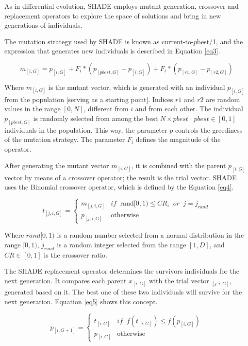 \documentclass[review]{elsarticle}
\begin{document}
As in differential evolution, SHADE employs mutant generation, crossover and replacement operators to explore the space of solutions and bring in new generations of individuals.

The mutation strategy used by SHADE is known as current-to-$p$best/1, and the expression that generates new individuals is described in Equation \eqref{eq3}.

\begin{equation}
m_{[i,G]} = p_{[i,G]} + F_i * (p_{[pbest, G]} - p_{[i,G]}) + F_i * (p_{[r1, G]} - p_{[r2,G]})
\label{eq3}
\end{equation}

Where $m_{[i,G]}$ is the mutant vector, which is generated with an individual $p_{[i,G]}$ from the population [serving as a starting point]. Indices $r1$ and $r2$ are random values in the range $[0,N]$, different from $i$ and from each other. The individual $p_{[pbest, G]}$ is randomly selected from among the best $N \times pbest\;|\;pbest\in [0,1]$ individuals in the population. This way, the parameter $p$ controls the greediness of the mutation strategy. The parameter $F_i$ defines the magnitude of the operator.

After generating the mutant vector $m_{[i,G]}$, it is combined with the parent $p_{[i,G]}$ vector by means of a crossover operator; the result is the trial vector. SHADE uses the Binomial crossover operator, which is defined by the Equation \eqref{eq4}.

\begin{equation}
t_{[j,i,G]} = \left\{ \begin{array}{lc}
m_{[j,i,G]} &   if \;\; \text{rand}[0,1) \le CR_i \;\; or \;\;j = j_{rand} \\
p_{[j,i,G]} &  \text{otherwise}
\end{array}
\right.
\label{eq4}
\end{equation}

Where $rand[0,1)$ is a random number selected from a normal distribution in the range $[0,1)$, $j_{rand}$ is a random integer selected from the range $[1,D]$, and $CR \in [0,1]$ is the crossover ratio.

The SHADE replacement operator determines the survivors individuals for the next generation. It compares each parent $x_{[i,G]}$ with the trial vector $_{[j,i,G]}$, generated based on it. The best one of these two individuals will survive for the next generation. Equation \eqref{eq5} shows this concept.

\begin{equation}
p_{[i,G + 1]} = \left\{ \begin{array}{lc}
t_{[i,G]} &   if \;\; f(t_{[i,G]}) \le f(p_{[i,G]}) \\
p_{[i,G]} &  \text{otherwise}
\end{array}
\right.
\label{eq5}
\end{equation}
\end{document}
